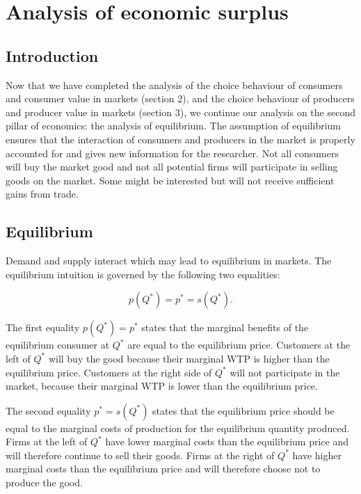 \documentclass[
]{book}
\begin{document}
\hypertarget{sec:econsurplus}{%
\section{Analysis of economic surplus}\label{sec:econsurplus}}

\hypertarget{introduction-2}{%
\subsection{Introduction}\label{introduction-2}}

Now that we have completed the analysis of the choice behaviour of consumers and consumer value in markets (section 2), and the choice behaviour of producers and producer value in markets (section 3), we continue our analysis on the second pillar of economics: the analysis of equilibrium. The assumption of equilibrium ensures that the interaction of consumers and producers in the market is properly accounted for and gives new information for the researcher. Not all consumers will buy the market good and not all potential firms will participate in selling goods on the market. Some might be interested but will not receive sufficient gains from trade.

\hypertarget{equilibrium}{%
\subsection{Equilibrium}\label{equilibrium}}

Demand and supply interact which may lead to equilibrium in markets. The equilibrium intuition is governed by the following two equalities:

\begin{equation}
p(Q^\ast)= p^\ast=s(Q^\ast).
\end{equation}

The first equality \(p(Q^\ast)= p^\ast\) states that the marginal benefits of the equilibrium consumer at \(Q^\ast\) are equal to the equilibrium price. Customers at the left of \(Q^\ast\) will buy the good because their marginal WTP is higher than the equilibrium price. Customers at the right side of \(Q^\ast\) will not participate in the market, because their marginal WTP is lower than the equilibrium price.

The second equality \(p^\ast=s(Q^\ast)\) states that the equilibrium price should be equal to the marginal costs of production for the equilibrium quantity produced. Firms at the left of \(Q^\ast\) have lower marginal costs than the equilibrium price and will therefore continue to sell their goods. Firms at the right of \(Q^\ast\) have higher marginal costs than the equilibrium price and will therefore choose not to produce the good.
\end{document}
